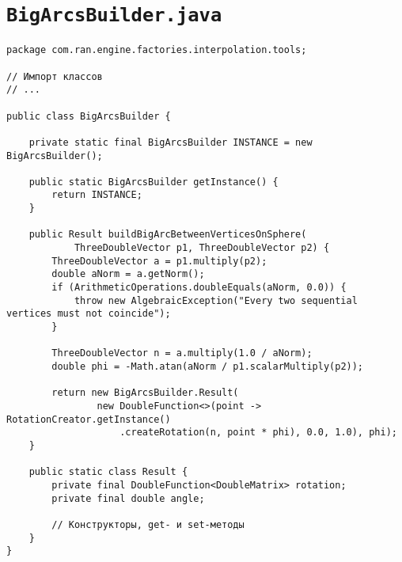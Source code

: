 \section*{\texttt{BigArcsBuilder.java}}
\begin{verbatim}
package com.ran.engine.factories.interpolation.tools;

// Импорт классов
// ...

public class BigArcsBuilder {

    private static final BigArcsBuilder INSTANCE = new BigArcsBuilder();

    public static BigArcsBuilder getInstance() {
        return INSTANCE;
    }

    public Result buildBigArcBetweenVerticesOnSphere(
            ThreeDoubleVector p1, ThreeDoubleVector p2) {
        ThreeDoubleVector a = p1.multiply(p2);
        double aNorm = a.getNorm();
        if (ArithmeticOperations.doubleEquals(aNorm, 0.0)) {
            throw new AlgebraicException("Every two sequential vertices must not coincide");
        }

        ThreeDoubleVector n = a.multiply(1.0 / aNorm);
        double phi = -Math.atan(aNorm / p1.scalarMultiply(p2));

        return new BigArcsBuilder.Result(
                new DoubleFunction<>(point -> RotationCreator.getInstance()
                    .createRotation(n, point * phi), 0.0, 1.0), phi);
    }

    public static class Result {
        private final DoubleFunction<DoubleMatrix> rotation;
        private final double angle;

        // Конструкторы, get- и set-методы
    }
}
\end{verbatim}

